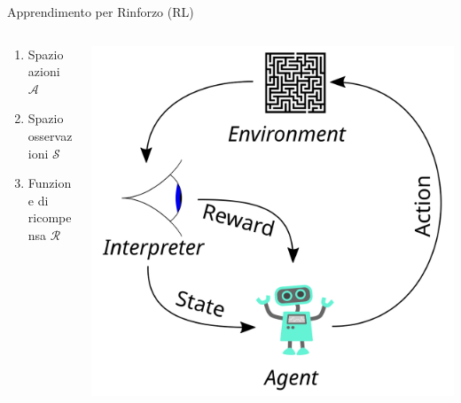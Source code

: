 \documentclass[]{beamer}
\begin{document}
\begin{frame}{Apprendimento per Rinforzo (RL)}
\begin{columns}
\begin{column}{.7\textwidth}
\begin{itemize}
                \begin{enumerate}
                    \item Spazio azioni $\mathcal{A}$
                    \item Spazio osservazioni $\mathcal{S}$
                    \item Funzione di ricompensa $\mathcal{R}$
                \end{enumerate}
            \end{itemize}
        \end{column}
        \begin{column}{.4\textwidth}
            \centering
            \includegraphics[width=.9\textwidth]{assets/2/rl_components.png}
        \end{column}
    \end{columns}
\end{frame}
\end{document}

